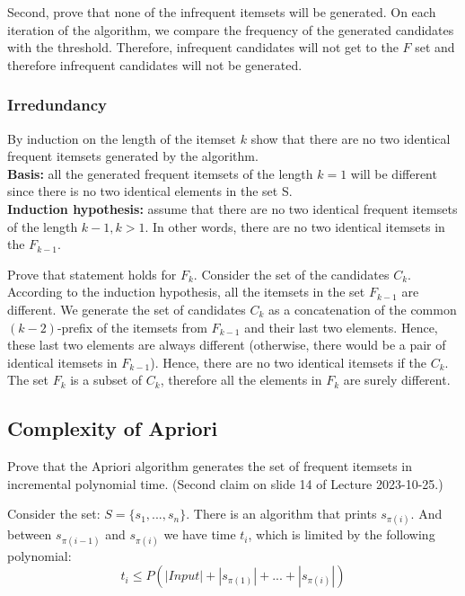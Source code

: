 \documentclass{article}
\begin{document}
  Second, prove that none of the infrequent itemsets will be generated. On each iteration of the algorithm, we compare the frequency of the generated candidates with the threshold. Therefore, infrequent candidates will not get to the $F$ set and therefore infrequent candidates will not be generated.

  \subsubsection{Irredundancy}

  By induction on the length of the itemset $k$ show that there are no two identical frequent itemsets generated by the algorithm. \\
  \textbf{Basis:} all the generated frequent itemsets of the length $k = 1$ will be different since there is no two identical elements in the set S. \\
  \textbf{Induction hypothesis:} assume that there are no two identical frequent itemsets of the length $k - 1, k > 1$. In other words, there are no two identical itemsets in the $F_{k-1}$.

  Prove that statement holds for $F_k$. Consider the set of the candidates $C_k$. According to the induction hypothesis, all the itemsets in the set $F_{k-1}$ are different. We generate the set of candidates $C_k$ as a concatenation of the common $(k-2)$-prefix of the itemsets from $F_{k-1}$ and their last two elements. Hence, these last two elements are always different (otherwise, there would be a pair of identical itemsets in $F_{k-1}$). Hence, there are no two identical itemsets if the $C_k$. The set $F_{k}$ is a subset of $C_k$, therefore all the elements in $F_{k}$ are surely different.

  \subsection{Complexity of Apriori}
  \begin{centerframebox}
    Prove that the Apriori algorithm generates the set of frequent itemsets in incremental polynomial time.
    (Second claim on slide 14 of Lecture 2023-10-25.)
  \end{centerframebox}
  Consider the set: $S = \{s_{1}, ... , s_{n}\}$. There is an algorithm that prints $s_{\pi(i)}$. And between $s_{\pi(i-1)}$ and $s_{\pi(i)}$ we have time $t_{i}$, which is limited by the following polynomial:
  $$t_{i} \leq P(|Input| + |s_{\pi(1)}| + ... + |s_{\pi(i)}|)$$
\end{document}
